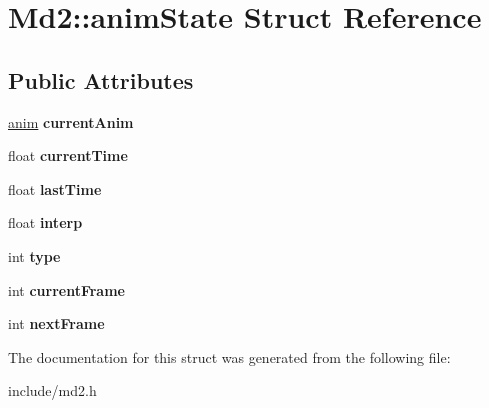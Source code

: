 \hypertarget{structMd2_1_1animState}{\section{Md2\-:\-:anim\-State Struct Reference}
\label{structMd2_1_1animState}
}
\subsection*{Public Attributes}
\begin{DoxyCompactItemize}
\item 
\hypertarget{structMd2_1_1animState_a3b2dce5c3ff323058c7487822afaa085}{\hyperlink{structMd2_1_1anim}{anim} {\bfseries current\-Anim}}\label{structMd2_1_1animState_a3b2dce5c3ff323058c7487822afaa085}

\item 
\hypertarget{structMd2_1_1animState_a8dd420c49a4351386a250dbcd3feac55}{float {\bfseries current\-Time}}\label{structMd2_1_1animState_a8dd420c49a4351386a250dbcd3feac55}

\item 
\hypertarget{structMd2_1_1animState_a3de5df147748b7c41be963dec7f38492}{float {\bfseries last\-Time}}\label{structMd2_1_1animState_a3de5df147748b7c41be963dec7f38492}

\item 
\hypertarget{structMd2_1_1animState_a9c18b775e52036f87cdf8191e9b41203}{float {\bfseries interp}}\label{structMd2_1_1animState_a9c18b775e52036f87cdf8191e9b41203}

\item 
\hypertarget{structMd2_1_1animState_a6b80663bede03cc5d3226271a2fbc260}{int {\bfseries type}}\label{structMd2_1_1animState_a6b80663bede03cc5d3226271a2fbc260}

\item 
\hypertarget{structMd2_1_1animState_a8a93517916e37665ef25705c08eef380}{int {\bfseries current\-Frame}}\label{structMd2_1_1animState_a8a93517916e37665ef25705c08eef380}

\item 
\hypertarget{structMd2_1_1animState_a4f4b0cb4120fe5e10b9fa6f49bd1a5de}{int {\bfseries next\-Frame}}\label{structMd2_1_1animState_a4f4b0cb4120fe5e10b9fa6f49bd1a5de}

\end{DoxyCompactItemize}


The documentation for this struct was generated from the following file\-:\begin{DoxyCompactItemize}
\item 
include/md2.\-h\end{DoxyCompactItemize}

